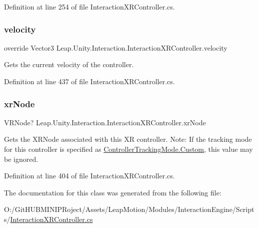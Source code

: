 Definition at line 254 of file Interaction\+X\+R\+Controller.\+cs.

\mbox{\label{class_leap_1_1_unity_1_1_interaction_1_1_interaction_x_r_controller_ae21cfe425c83f331f03044e9132674f7}} 
\subsubsection{\texorpdfstring{velocity}{velocity}}
{\footnotesize\ttfamily override Vector3 Leap.\+Unity.\+Interaction.\+Interaction\+X\+R\+Controller.\+velocity\hspace{0.3cm}{\ttfamily [get]}}



Gets the current velocity of the controller. 



Definition at line 437 of file Interaction\+X\+R\+Controller.\+cs.

\mbox{\label{class_leap_1_1_unity_1_1_interaction_1_1_interaction_x_r_controller_a11711962768f6818de5fb89cbbaeea65}} 
\subsubsection{\texorpdfstring{xrNode}{xrNode}}
{\footnotesize\ttfamily V\+R\+Node? Leap.\+Unity.\+Interaction.\+Interaction\+X\+R\+Controller.\+xr\+Node\hspace{0.3cm}{\ttfamily [get]}}



Gets the X\+R\+Node associated with this XR controller. Note\+: If the tracking mode for this controller is specified as \mbox{\hyperlink{namespace_leap_1_1_unity_1_1_interaction_ab4a739b7f8a6748903e2ccc029df7a50a90589c47f06eb971d548591f23c285af}{Controller\+Tracking\+Mode.\+Custom}}, this value may be ignored. 



Definition at line 404 of file Interaction\+X\+R\+Controller.\+cs.



The documentation for this class was generated from the following file\+:\begin{DoxyCompactItemize}
\item 
O\+:/\+Git\+H\+U\+B\+M\+I\+N\+I\+P\+Roject/\+Assets/\+Leap\+Motion/\+Modules/\+Interaction\+Engine/\+Scripts/\mbox{\hyperlink{_interaction_x_r_controller_8cs}{Interaction\+X\+R\+Controller.\+cs}}\end{DoxyCompactItemize}
